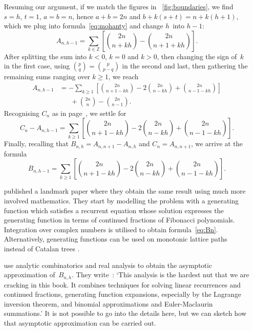 Resuming our argument, if we match the figures in
\fig~\ref{fig:boundaries}, we find \(s=h\), \(t=1\), \(a=b=n\),
hence \(a+b=2n\) and \(b+k(s+t)=n+k(h+1)\),
which we plug into formula~\eqref{eq:mohanty} and change \(h\)~into \(h-1\):
\begin{equation*}
A_{n,h-1} = \sum_{k \in \mathbb{Z}}\left[\binom{2n}{n+kh} -
           \binom{2n}{n+1+kh}\right].
\end{equation*}
After splitting the sum into \(k<0\), \(k=0\) and \(k>0\), then
changing the sign of~\(k\) in the first case, using \(\binom{p}{q} =
\binom{p}{p-q}\) in the second and last, then gathering the remaining
sums ranging over \(k \geqslant 1\), we reach
\begin{align*}
A_{n,h-1}
  &= - \sum_{k \geqslant 1}\left[\binom{2n}{n+1-kh} -
    2\binom{2n}{n-kh} + \binom{2n}{n-1-kh}\right]\\
  &\phantom{=}\; + \binom{2n}{n} - \binom{2n}{n-1}.
\end{align*}
Recognising \(C_n\) as in page~\pageref{eq:Ann}, we settle for
\begin{equation*}
C_n - A_{n,h-1}
  = \sum_{k \geqslant 1}\left[\binom{2n}{n+1-kh} -
    2\binom{2n}{n-kh} + \binom{2n}{n-1-kh}\right].
\end{equation*}
Finally, recalling that \(B_{n,h} = A_{n,n+1} - A_{n,h}\) and \(C_n =
A_{n,n+1}\), we arrive at the formula
\begin{equation}
B_{n,h-1} = \sum_{k \geqslant 1}
            \left[\binom{2n}{n+1-kh} - 2\binom{2n}{n-kh}
            + \binom{2n}{n-1-kh}\right].
\label{eq:Bn}
\end{equation}

\citet*{KnuthdeBruijnRice_1972} published a landmark paper where they
obtain the same result using much more involved mathematics. They
start by modelling the problem with a generating function
\citep{Wilf_1990} which satisfies a recurrent equation whose solution
expresses the generating function in terms of continued fractions of
Fibonacci polynomials. Integration over complex numbers is utilised to
obtain formula~\eqref{eq:Bn}. Alternatively, generating functions can
be used on monotonic lattice paths instead of Catalan trees
\citep[page~64]{Kemp_1984} \citep{FlajoletNebelProdinger_2006}.

\citet*{SedgewickFlajolet_1996} \citep{FlajoletSedgewick_2009} use
analytic combinatorics and real analysis to obtain the asymptotic
approximation of~\(B_{n,h}\). They
write~\cite[p.~260]{SedgewickFlajolet_1996}: `This analysis is the
hardest nut that we are cracking in this book. It combines techniques
for solving linear recurrences and continued fractions, generating
function expansions, especially by the Lagrange inversion theorem, and
binomial approximations and Euler\--Maclaurin summations.' It is not
possible to go into the details here, but we can sketch how that
asymptotic approximation can be carried out.

